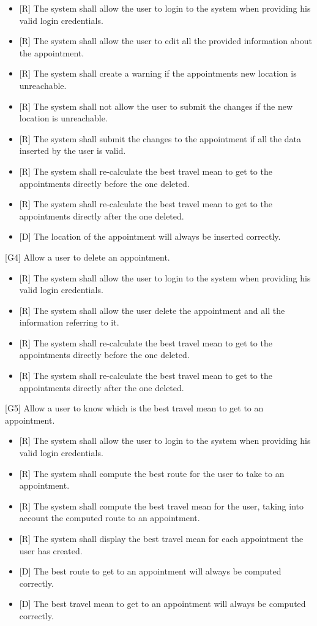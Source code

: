 \documentclass[12pt]{article}
\begin{document}
\begin{itemize}
    \item{[R]} The system shall allow the user to login to the system when providing his valid login credentials.
    \item{[R]} The system shall allow the user to edit all the provided information about the appointment.
    \item{[R]} The system shall create a warning if the appointments new location is unreachable.
    \item{[R]} The system shall not allow the user to submit the changes if the new location is unreachable.
    \item{[R]} The system shall submit the changes to the appointment if all the data inserted by the user is valid.
    \item{[R]} The system shall re-calculate the best travel mean to get to the appointments directly before the one deleted.
    \item{[R]} The system shall re-calculate the best travel mean to get to the appointments directly after the one deleted.
    \item {[D]} The location of the appointment will always be inserted correctly.
\end{itemize}
{[G4]} Allow a user to delete an appointment.
\begin{itemize}
    \item{[R]} The system shall allow the user to login to the system when providing his valid login credentials.
    \item{[R]} The system shall allow the user delete the appointment and all the information referring to it.
    \item{[R]} The system shall re-calculate the best travel mean to get to the appointments directly before the one deleted.
    \item{[R]} The system shall re-calculate the best travel mean to get to the appointments directly after the one deleted.
\end{itemize}
{[G5]} Allow a user to know which is the best travel mean to get to an appointment.
\begin{itemize}
    \item{[R]} The system shall allow the user to login to the system when providing his valid login credentials.
    \item{[R]} The system shall compute the best route for the user to take to an appointment.
    \item{[R]} The system shall compute the best travel mean for the user, taking into account the computed route to an appointment.
    \item{[R]} The system shall display the best travel mean for each appointment the user has created.
    \item{[D]} The best route to get to an appointment will always be computed correctly.
    \item{[D]} The best travel mean to get to an appointment will always be computed correctly.
    
\end{itemize}
\end{document}
